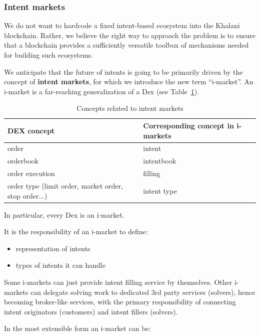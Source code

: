 \documentclass[a4paper]{article}
\begin{document}
\subsubsection{Intent markets}

We do not want to hardcode a fixed intent-based ecosystem into the Khalani blockchain. Rather, we believe the right way to approach the problem is to ensure that a blockchain provides a sufficiently versatile toolbox of mechanisms needed for building such ecosystems.

We anticipate that the future of intents is going to be primarily driven by the concept of \textbf{intent markets}, for which we introduce the new term ``i-market''. An i-market is a far-reaching generalization of a Dex (see Table~\ref{table:i-market-concepts}).

\begin{table}
\caption{Concepts related to intent markets}
\label{table:i-market-concepts}
\centering
\begin{tabularx}{\textwidth}{| X | p{} |} %
\toprule
\textbf{DEX concept} & \textbf{Corresponding concept in i-markets} \\
\midrule
order & intent \\
\midrule
orderbook & intentbook \\
\midrule
order execution & filling \\
\midrule
order type (limit order, market order, stop order...) & intent type \\
\bottomrule
\end{tabularx}
\end{table}

In particular, every Dex is an i-market.

It is the responsibility of an i-market to define:

\begin{itemize}
  \item representation of intents
  \item types of intents it can handle
\end{itemize}

Some i-markets can just provide intent filling service by themselves. Other i-markets can delegate solving work to dedicated 3rd party services (solvers), hence becoming broker-like services, with the primary responsibility of connecting intent originators (customers) and intent fillers (solvers).

In the most extensible form an i-market can be:
\end{document}
